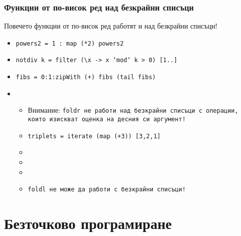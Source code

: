 \documentclass{beamer}
\begin{document}
\begin{frame}
  \frametitle{Функции от по-висок ред над безкрайни списъци}
  Повечето функции от по-висок ред работят и над безкрайни списъци!
  \begin{itemize}[<+->]
  \item \tt{powers2 = 1 : map (*2) powers2}
  \item \tt{notdiv k = filter (\textbackslash x -> x `mod` k > 0) [1..]}
  \item \tt{fibs = 0:1:zipWith (+) fibs (tail fibs)}
  \item {}
    \begin{itemize}
    \item \alert{Внимание:} \tt{foldr} не работи над безкрайни списъци с операции, които изискват оценка на десния си аргумент!
    \item \tt{triplets = iterate (map (+3)) [3,2,1]}
    \item {}
    \item {}
    \item {}
    \item \alert{\tt{foldl} не може да работи с безкрайни списъци!}
    \end{itemize}
  \end{itemize}
\end{frame}

\section{Безточково програмиране}
\end{document}
